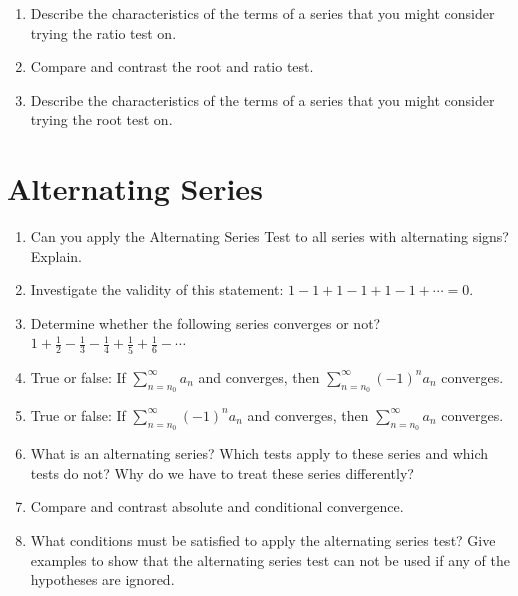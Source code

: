 \begin{enumerate}
\item Describe the characteristics of the terms of a series that you might consider trying the ratio test on.  

\item Compare and contrast the root and ratio test.

\item Describe the characteristics of the terms of a series that you might consider trying the root test on.

\end{enumerate}
\section{Alternating Series}
\begin{enumerate}

\item Can you apply the Alternating Series Test to all series with alternating signs?  Explain.

\item Investigate the validity of this statement:  $
1 - 1 + 1 - 1 + 1 - 1 +  \cdots  = 0$.

\item Determine whether the following series converges or not?  $1 + \frac{1}{2} - \frac{1}{3} - \frac{1}{4} + \frac{1}{5} + \frac{1}{6} -  \cdots $


\item True or false: If $\displaystyle\sum\limits_{n = n_0 }^\infty  {a_n } $
 and converges, then $\displaystyle\sum\limits_{n = n_0 }^\infty  {\left( { - 1} \right)^n a_n } $ converges.

\item True or false: If $\displaystyle\sum\limits_{n = n_0 }^\infty  {\left( { - 1} \right)^n a_n } $  and converges, then $\displaystyle\sum\limits_{n = n_0 }^\infty  {a_n } 
$ converges.

\item What is an alternating series?  Which tests apply to these series and which tests do not?  Why do we have to treat these series differently?

\item Compare and contrast absolute and conditional convergence.

\item What conditions must be satisfied to apply the alternating series test?  Give examples to show that the alternating series test can not be used if any of the hypotheses are ignored.


\end{enumerate}
